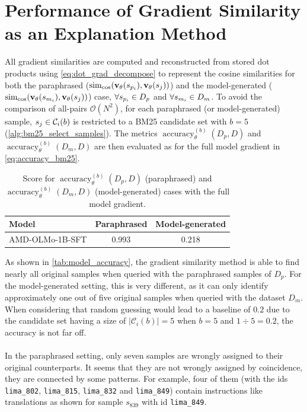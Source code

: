 \section{Performance of Gradient Similarity as an Explanation Method}\label{sec:baseline_perf}
All gradient similarities are computed and reconstructed from stored dot products using \autoref{eq:dot_grad_decompose} to represent the cosine similarities for both the paraphrased ($\operatorname{sim}_{\cos}(\mathbf{v}_{\theta}(s_{p_i}), \mathbf{v}_{\theta}(s_j))$) and the model-generated ($\operatorname{sim}_{\cos}(\mathbf{v}_{\theta}(s_{m_i}), \mathbf{v}_{\theta}(s_j))$) case, $\forall s_{p_i} \in D_p$ and $\forall s_{m_i} \in D_m$. To avoid the comparison of all-pairs $\mathcal{O}(N^2)$, for each paraphrased (or model-generated) sample, $s_j \in \mathcal{C}_i(b)$ is restricted to a BM25 candidate set with $b=5$ (\autoref{alg:bm25_select_samples}). The metrics $\operatorname{accuracy}^{(b)}_{\theta}(D_p,D)$ and $\operatorname{accuracy}^{(b)}_{\theta}(D_m,D)$ are then evaluated as for the full model gradient in \autoref{eq:accuracy_bm25}.
\begin{table}[ht!]
    \centering
    \begin{tabular}{|l|c|c|}
        \hline
        \textbf{Model} & \textbf{Paraphrased} & \textbf{Model-generated} \\
        \hline
        AMD-OLMo-1B-SFT & 0.993 & 0.218 \\
        \hline
    \end{tabular}
    \caption{Score for $\operatorname{accuracy}^{(b)}_{\theta}(D_p,D)$ (paraphrased) and $\operatorname{accuracy}^{(b)}_{\theta}(D_m,D)$ (model-generated) cases with the full model gradient.}
    \label{tab:model_accuracy}
\end{table}
\noindent As shown in \autoref{tab:model_accuracy}, the gradient similarity method is able to find nearly all original samples when queried with the paraphrased samples of $D_p$. For the model-generated setting, this is very different, as it can only identify approximately one out of five original samples when queried with the dataset $D_m$. When considering that random guessing would lead to a baseline of $0.2$ due to the candidate set having a size of $\lvert\mathcal{C}_i(b)\rvert = 5$ when $b=5$ and $1 \div 5=0.2$, the accuracy is not far off.
\\\\
In the paraphrased setting, only seven samples are wrongly assigned to their original counterparts. It seems that they are not wrongly assigned by coincidence, they are connected by some patterns. For example, four of them (with the ids \texttt{lima\_802}, \texttt{lima\_815}, \texttt{lima\_832} and \texttt{lima\_849}) contain instructions like translations as shown for sample $s_{839}$ with id \texttt{lima\_849}. 

